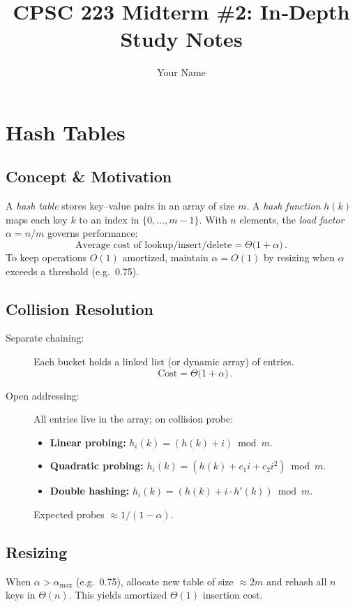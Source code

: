 \documentclass[12pt]{article}
\begin{document}
\title{CPSC 223 Midterm \#2: In‑Depth Study Notes}
\author{Your Name}
\date{}
\maketitle

\tableofcontents
\newpage

\section{Hash Tables}
\subsection*{Concept \& Motivation}
A \emph{hash table} stores key–value pairs in an array of size \(m\).  A \emph{hash function} \(h(k)\) maps each key \(k\) to an index in \(\{0,\dots,m-1\}\).  With \(n\) elements, the \emph{load factor} \(\alpha = n / m\) governs performance:
\[
  \text{Average cost of lookup/insert/delete} = \Theta\bigl(1 + \alpha\bigr)\,.
\]
To keep operations \(O(1)\) amortized, maintain \(\alpha = O(1)\) by resizing when \(\alpha\) exceeds a threshold (e.g.\ 0.75).

\subsection*{Collision Resolution}
\begin{description}
  \item[Separate chaining:] Each bucket holds a linked list (or dynamic array) of entries.
    \[
      \text{Cost} = \Theta\bigl(1 + \alpha\bigr)\,.
    \]
  \item[Open addressing:] All entries live in the array; on collision probe:
    \begin{itemize}
      \item \textbf{Linear probing:} \(h_i(k) = (h(k) + i)\bmod m\).
      \item \textbf{Quadratic probing:} \(h_i(k) = (h(k) + c_1 i + c_2 i^2)\bmod m\).
      \item \textbf{Double hashing:} \(h_i(k) = (h(k) + i\cdot h'(k))\bmod m\).
    \end{itemize}
    Expected probes \(\approx 1/(1-\alpha)\).
\end{description}

\subsection*{Resizing}
When \(\alpha > \alpha_{\max}\) (e.g.\ 0.75), allocate new table of size \(\approx 2m\) and rehash all \(n\) keys in \(\Theta(n)\).  This yields amortized \(\Theta(1)\) insertion cost.
\end{document}
